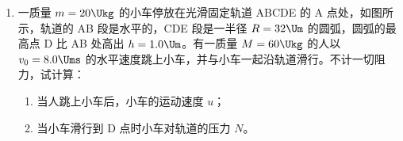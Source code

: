 \documentclass[\gkver]{gaokaozhenti}
\begin{document}
\begin{enumerate}
{（2）解：设管内外水银面的高度差为 $h\Ucm$，由（1）可知，是管外水银面高于管内，又设管的截面积为 $S\Ucmq$，则：

管内空气的初状态：压强 $p_{1}=75\UcmHg$，体积 $V_{1}=27S\Ucmc$

管内空气的末状态：压强 $p_{2}=(75+h)\UcmHg$，体积 $V_{2}=(27-8+h)S\Ucmc$

由玻意耳$-$马特略定律 $p_{1}V_{1}=p_{2}V_{2}$（1 分）

代入得：$75\times27S=(75+h)(27-8+h)S$（3 分）

$h^{2}+94h-600=0$

$(h+100)(h-6)=0$

$h=6\Ucm$（1 分）

$h=-100\Ucm$（不合题意舍去）
}

\item
一质量 $m=20\Ukg$ 的小车停放在光滑固定轨道 ABCDE 的 A 点处，如图所示，轨道的 AB 段是水平的，CDE 段是一半径 $R=32\Um$ 的圆弧，圆弧的最高点 D 比 AB 处高出 $h=1.0\Um$。有一质量 $M=60\Ukg$ 的人以 $v_{0}=8.0\Ums$ 的水平速度跳上小车，并与小车一起沿轨道滑行。不计一切阻力，试计算：
\begin{enumerate}
	\item
	当人跳上小车后，小车的运动速度 $u$；
	\item
	当小车滑行到 D 点时小车对轨道的压力 $N$。
\end{enumerate}
\onepicture[align=right, w=8cm]{}


\end{enumerate}
\end{document}
